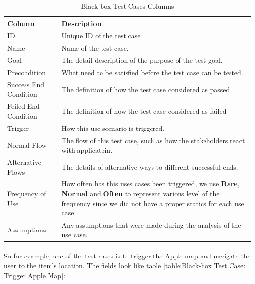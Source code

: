 \documentclass[12pt,a4paper]{article}
\begin{document}
          \begin{table}[H]
            \centering
              \begin{tabularx}{\textwidth}{l X}
                \hline
                Column & Description  \\ \hline
                ID & Unique ID of the test case \\ 
                Name & Name of the test case.  \\ 
                Goal & The detail description of the purpose of the test goal. \\ 
                Precondition & What need to be satisfied before the test case can be tested.\\
                Success End Condition & The definition of how the test case considered as passed \\
                Feiled End Condition & The definition of how the test case considered as failed \\
                Trigger & How this use scenario is triggered.\\
                Normal Flow & The flow of this test case, such as how the stakeholders react with applicatoin.\\
                Alternative Flows & The details of alternative ways to different successful ends.\\
                Frequency of Use & How often has this uses cases been triggered, we use {\bf Rare}, {\bf Normal} and {\bf Often} to represent various level of the frequency since we did not have a proper statics for each use case.\\
                Assumptions & Any assumptions that were made during the analysis of the use case. \\
                \hline
              \end{tabularx}
              \caption[Table caption text]{Black-box Test Cases Columns}
              \label{table:Black-box Test Cases Columns}
          \end{table}

          \paragraph{} So for example, one of the test cases is to trigger the Apple map and navigate the user to the item's location. The fields look like table \ref{table:Black-box Test Case: Trigger Apple Map}:
\end{document}
